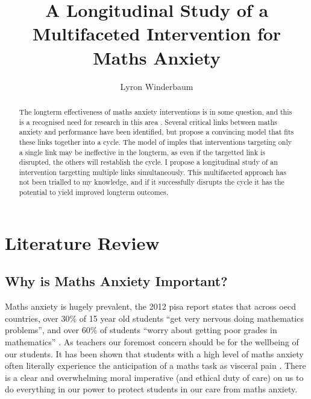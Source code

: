 \documentclass[14pt]{memoir}
\title{A Longitudinal Study of a Multifaceted Intervention for Maths Anxiety}
\author{Lyron Winderbaum}
\begin{document}
\maketitle



\begin{abstract}

The longterm effectiveness of maths anxiety interventions is in some question, and this is a recognised need for research in this area \cite{Pellicioni2016,Chang2016}. Several critical links between maths anxiety and performance have been identified, but  propose a convincing model that fits these links together into a cycle. The model of  imples that interventions targeting only a single link may be ineffective in the longterm, as even if the targetted link is disrupted, the others will restablish the cycle. I propose a longitudinal study of an intervention targetting multiple links simultaneously. This multifaceted approach has not been trialled to my knowledge, and if it successfully disrupts the cycle it has the potential to yield improved longterm outcomes.

\end{abstract}


\pagebreak
\glsresetall
\section{Literature Review}


\subsection*{Why is Maths Anxiety Important?}

Maths anxiety is hugely prevalent, the 2012 \gls{pisa} report states that across \gls{oecd} countries, over 30\% of 15 year old students ``get very nervous doing mathematics problems'', and over 60\% of students ``worry about getting poor grades in mathematics''  \cite{PISA2013}. As teachers our foremost concern should be for the wellbeing of our students. It has been shown that students with a high level of maths anxiety often literally experience the anticipation of a maths task as visceral pain \cite{Lyons2012pain}. There is a clear and overwhelming moral imperative (and ethical duty of care) on us to do everything in our power to protect students in our care from maths anxiety.
\end{document}
